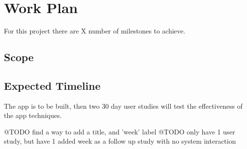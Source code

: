 
\newpage
\section{Work Plan}

For this project there are X number of milestones to achieve.


\subsection*{Scope}

\subsection*{Expected Timeline}

The app is to be built, then two 30 day user studies will test the effectiveness of the app techniques.




@TODO find a way to add a title, and 'week' label
@TODO only have 1 user study, but have 1 added week as a follow up study with no system interaction


